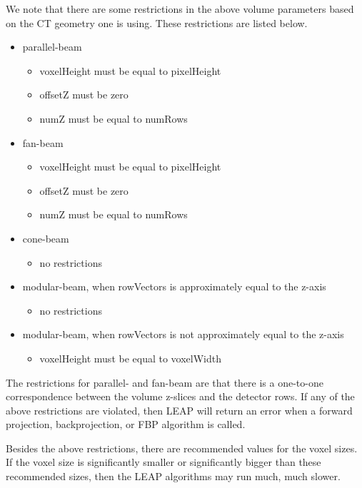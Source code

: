 \documentclass[11pt]{article}
\begin{document}
We note that there are some restrictions in the above volume parameters based on the CT geometry one is using.  These restrictions are listed below.
\begin{itemize}
\item parallel-beam
    \begin{itemize}
    \item voxelHeight must be equal to pixelHeight
    \item offsetZ must be zero
    \item numZ must be equal to numRows
    \end{itemize}
\item fan-beam
    \begin{itemize}
    \item voxelHeight must be equal to pixelHeight
    \item offsetZ must be zero
    \item numZ must be equal to numRows
    \end{itemize}
\item cone-beam
    \begin{itemize}
    \item no restrictions
    \end{itemize}
\item modular-beam, when rowVectors is approximately equal to the z-axis
    \begin{itemize}
    \item no restrictions
    \end{itemize}
\item modular-beam, when rowVectors is not approximately equal to the z-axis
    \begin{itemize}
    \item voxelHeight must be equal to voxelWidth
    \end{itemize}
\end{itemize}
The restrictions for parallel- and fan-beam are that there is a one-to-one correspondence between the volume z-slices and the detector rows.  If any of the above restrictions are violated, then LEAP will return an error when a forward projection, backprojection, or FBP algorithm is called.

Besides the above restrictions, there are recommended values for the voxel sizes.  If the voxel size is significantly smaller or significantly bigger than these recommended sizes, then the LEAP algorithms may run much, much slower.
\end{document}
